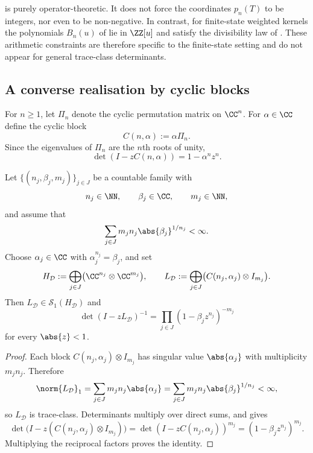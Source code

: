 \begin{remark}
  \label{rem:witt-audit-constraints}
   is purely operator-theoretic. It does
  not force the coordinates $p_n(T)$ to be integers, nor even to be
  non-negative. In contrast, for finite-state weighted kernels the
  polynomials $B_n(u)$ of  lie in
  $\ZZ[u]$ and satisfy the divisibility law of
  . These arithmetic
  constraints are therefore specific to the finite-state setting and do
  not appear for general trace-class determinants.
\end{remark}

\subsection{A converse realisation by cyclic blocks}

For $n\ge 1$, let $\Pi_n$ denote the cyclic permutation matrix on
$\CC^n$. For $\alpha\in\CC$ define the cyclic block
\[
  C(n,\alpha):=\alpha \Pi_n.
\]
Since the eigenvalues of $\Pi_n$ are the $n$th roots of unity,
\begin{equation}
  \label{eq:cycle-block-det}
  \det(I-zC(n,\alpha))=1-\alpha^n z^n.
\end{equation}

\begin{theorem}
  \label{thm:cyclic-fredholm-realisation}
  Let $\{(n_j,\beta_j,m_j)\}_{j\in J}$ be a countable family with
  \[
    n_j\in\NN,\qquad
    \beta_j\in\CC,\qquad
    m_j\in\NN,
  \]
  and assume that
  \[
    \sum_{j\in J} m_j n_j \abs{\beta_j}^{1/n_j}<\infty.
  \]
  Choose $\alpha_j\in\CC$ with $\alpha_j^{n_j}=\beta_j$, and set
  \[
    H_{\mathcal D}
    :=\bigoplus_{j\in J}\bigl(\CC^{n_j}\otimes\CC^{m_j}\bigr),
    \qquad
    L_{\mathcal D}
    :=\bigoplus_{j\in J}\bigl(C(n_j,\alpha_j)\otimes I_{m_j}\bigr).
  \]
  Then $L_{\mathcal D}\in\mathcal S_1(H_{\mathcal D})$ and
  \[
    \det(I-zL_{\mathcal D})^{-1}
    =\prod_{j\in J}(1-\beta_j z^{n_j})^{-m_j}
  \]
  for every $\abs{z}<1$.
\end{theorem}

\begin{proof}
  Each block $C(n_j,\alpha_j)\otimes I_{m_j}$ has singular value
  $\abs{\alpha_j}$ with multiplicity $m_j n_j$. Therefore
  \[
    \norm{L_{\mathcal D}}_1
    =\sum_{j\in J} m_j n_j \abs{\alpha_j}
    =\sum_{j\in J} m_j n_j \abs{\beta_j}^{1/n_j}
    <\infty,
  \]
  so $L_{\mathcal D}$ is trace-class. Determinants multiply over direct
  sums, and  gives
  \[
    \det\!\bigl(I-z(C(n_j,\alpha_j)\otimes I_{m_j})\bigr)
    =\det(I-zC(n_j,\alpha_j))^{m_j}
    =(1-\beta_j z^{n_j})^{m_j}.
  \]
  Multiplying the reciprocal factors proves the identity.
\end{proof}

